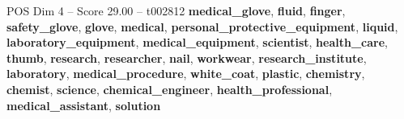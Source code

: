 \begin{textsample}{POS Dim 4 – Score 29.00 – t002812}  \label{ex:f4_pos_019}
\textbf{medical\_glove}, \textbf{fluid}, \textbf{finger}, \textbf{safety\_glove}, \textbf{glove}, \textbf{medical}, \textbf{personal\_protective\_equipment}, \textbf{liquid}, \textbf{laboratory\_equipment}, \textbf{medical\_equipment}, \textbf{scientist}, \textbf{health\_care}, \textbf{thumb}, \textbf{research}, \textbf{researcher}, \textbf{nail}, \textbf{workwear}, \textbf{research\_institute}, \textbf{laboratory}, \textbf{medical\_procedure}, \textbf{white\_coat}, \textbf{plastic}, \textbf{chemistry}, \textbf{chemist}, \textbf{science}, \textbf{chemical\_engineer}, \textbf{health\_professional}, \textbf{medical\_assistant}, \textbf{solution}

\end{textsample}
